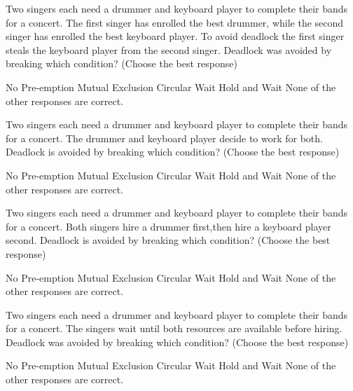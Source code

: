 

\variant
Two singers each need a drummer and keyboard player to complete their bands for a concert. The first singer has enrolled the best drummer, while the second singer has enrolled the best keyboard player. To avoid deadlock the first singer steals the keyboard player from the second singer. Deadlock was avoided by breaking which condition? (Choose the best response)
\begin{answers}
\correctanswer No Pre-emption 
\answer Mutual Exclusion
\answer Circular Wait 
\answer Hold and Wait
\answer None of the other responses are correct.
\end{answers}
\begin{solution}
\end{solution}


\variant
Two singers each need a drummer and keyboard player to complete their bands for a concert. The drummer and keyboard player decide to work for both. Deadlock is avoided by breaking which condition? (Choose the best response)
\begin{answers}
\answer No Pre-emption 
\correctanswer Mutual Exclusion
\answer Circular Wait 
\answer Hold and Wait
\answer None of the other responses are correct.
\end{answers}
\begin{solution}
\end{solution}



\variant
Two singers each need a drummer and keyboard player to complete their bands for a concert. Both singers hire a drummer first,then hire a keyboard player second. Deadlock is avoided by breaking which condition? (Choose the best response)
\begin{answers}
\answer No Pre-emption 
\answer Mutual Exclusion
\correctanswer Circular Wait 
\answer Hold and Wait
\answer None of the other responses are correct.
\end{answers}
\begin{solution}
\end{solution}



\variant
Two singers each need a drummer and keyboard player to complete their bands for a concert. The singers wait until both resources are available before hiring.  Deadlock was avoided by breaking which condition? (Choose the best response)
\begin{answers}
\answer No Pre-emption 
\answer Mutual Exclusion
\answer Circular Wait 
\correctanswer Hold and Wait
\answer None of the other responses are correct.
\end{answers}
\begin{solution}
\end{solution}


